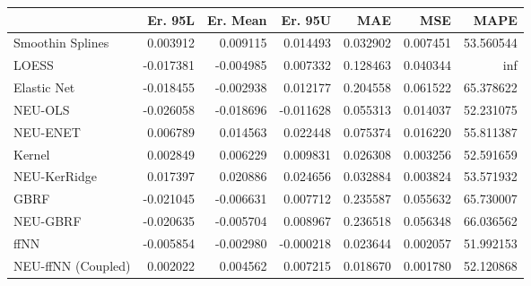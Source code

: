 \begin{tabular}{lrrrrrr}
\toprule
{} &   Er. 95L &  Er. Mean &   Er. 95U &       MAE &       MSE &       MAPE \\
\midrule
Smoothin Splines   &  0.003912 &  0.009115 &  0.014493 &  0.032902 &  0.007451 &  53.560544 \\
LOESS              & -0.017381 & -0.004985 &  0.007332 &  0.128463 &  0.040344 &        inf \\
Elastic Net        & -0.018455 & -0.002938 &  0.012177 &  0.204558 &  0.061522 &  65.378622 \\
NEU-OLS            & -0.026058 & -0.018696 & -0.011628 &  0.055313 &  0.014037 &  52.231075 \\
NEU-ENET           &  0.006789 &  0.014563 &  0.022448 &  0.075374 &  0.016220 &  55.811387 \\
Kernel             &  0.002849 &  0.006229 &  0.009831 &  0.026308 &  0.003256 &  52.591659 \\
NEU-KerRidge       &  0.017397 &  0.020886 &  0.024656 &  0.032884 &  0.003824 &  53.571932 \\
GBRF               & -0.021045 & -0.006631 &  0.007712 &  0.235587 &  0.055632 &  65.730007 \\
NEU-GBRF           & -0.020635 & -0.005704 &  0.008967 &  0.236518 &  0.056348 &  66.036562 \\
ffNN               & -0.005854 & -0.002980 & -0.000218 &  0.023644 &  0.002057 &  51.992153 \\
NEU-ffNN (Coupled) &  0.002022 &  0.004562 &  0.007215 &  0.018670 &  0.001780 &  52.120868 \\
\bottomrule
\end{tabular}
